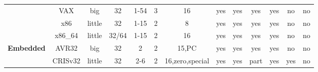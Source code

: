\begin{sidewaystable}[tbp]
\begin{sf}
\begin{footnotesize}
\begin{center}
\begin{tabular}{|c|c||c|c|c|c|c|c|c|c|c|c|c|}
                 & %
VAX              & %
big              & %
32               & %
1-54             & %
3                & %
16               & %
yes              & %
yes              & %
yes              & %
yes              & %
no               & %
no                 %
\\
\cline{2-13}

                 & %
x86              & %
little           & %
32               & %
1-15             & %
2                & %
8                & %
yes              & %
yes              & %
yes              & %
yes              & %
no               & %
no                 %
\\
\cline{2-13}

		 & %
x86\_64          & %
little           & %
32/64            & %
1-15             & %
2                & %
16               & %
yes              & %
yes              & %
yes              & %
yes              & %
no               & %
no                 %
\\

\hline\hline


\multirow{5}{*}{\bf Embedded} &
AVR32            & %
big              & %
32               & %
2                & %
2                & %
15,PC            & %
yes              & %
yes              & %
yes              & %
yes              & %
no               & %
no                 %
\\
\cline{2-13}

                 & %
CRISv32          & %
little           & %
32               & %
2-6              & %
2                & %
16,zero,special  & %
yes              & %
yes              & %
part             & %
yes              & %
yes              & %
no                 %
\\
\cline{2-13}


\end{tabular}
\end{center}
\end{footnotesize}
\end{sf}
\end{sidewaystable}
